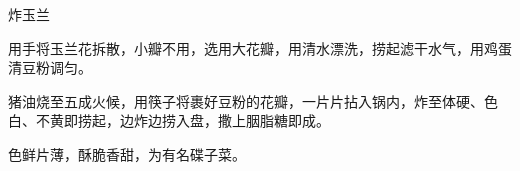 %
%
%
%
%
%
%
\begin{recipe}{炸玉兰}

\ingredients


\preparation

\step 用手将玉兰花拆散，小瓣不用，选用大花瓣，用清水漂洗，捞起滤干水气，用鸡蛋
清豆粉调匀。

\step 猪油烧至五成火候，用筷子将裹好豆粉的花瓣，一片片拈入锅内，炸至体硬、色
白、不黄即捞起，边炸边捞入盘，撒上胭脂糖即成。

\features

色鲜片薄，酥脆香甜，为有名碟子菜。

\end{recipe}

